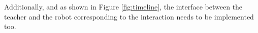 \documentclass[manuscript, review, anonymous]{acmart}
\newcommand{\ES}[1]{\added[id=ES]{#1}}
\newcommand{\SL}[1]{\added[id=SL]{#1}}
\begin{document}
Additionally, and as shown in Figure \ref{fig:timeline}, the interface between the 
teacher and the robot corresponding to the interaction needs to be implemented too.

\end{document}
